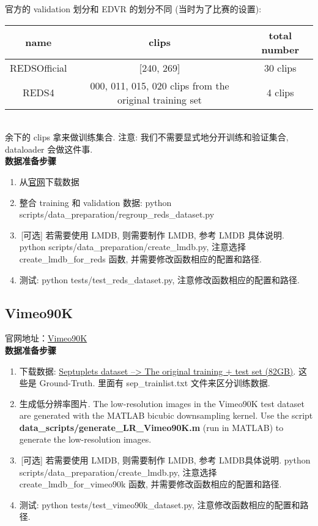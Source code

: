 \documentclass[../main.tex]{subfiles}
\begin{document}
官方的 validation 划分和 EDVR 的划分不同 (当时为了比赛的设置):\\
\begin{table}[htbp]
    \centering
    {
        \begin{tabular}{|c|c|c|}
            \hline
            \textbf{name} & \textbf{clips} & \textbf{total number}                               \\ \hline
            REDSOfficial              & [240, 269]      & 30 clips                               \\ \hline
            REDS4          & 000, 011, 015, 020 clips from the original training set      & 4 clips       \\ \hline
        \end{tabular}
    }
\end{table}\\
余下的 clips 拿来做训练集合. 注意: 我们不需要显式地分开训练和验证集合, dataloader 会做这件事.\\

\noindent\textbf{数据准备步骤}

\begin{enumerate}
\item 从\href{https://seungjunnah.github.io/Datasets/reds.html}{官网}下载数据
\item 整合 training 和 validation 数据: python scripts/data\_preparation/regroup\_reds\_dataset.py
\item\,[可选] 若需要使用 LMDB, 则需要制作 LMDB, 参考 LMDB 具体说明. python scripts/data\_preparation/create\_lmdb.py, 注意选择 create\_lmdb\_for\_reds 函数, 并需要修改函数相应的配置和路径.
\item 测试: python tests/test\_reds\_dataset.py, 注意修改函数相应的配置和路径.
\end{enumerate}

\subsection{Vimeo90K}

官网地址：\href{http://toflow.csail.mit.edu/}{Vimeo90K}\\

\noindent\textbf{数据准备步骤}
\begin{enumerate}
\item 下载数据: \href{http://data.csail.mit.edu/tofu/dataset/vimeo_septuplet.zip}{Septuplets dataset --> The original training + test set (82GB)}. 这些是 Ground-Truth. 里面有 sep\_trainlist.txt 文件来区分训练数据.
\item 生成低分辨率图片. The low-resolution images in the Vimeo90K test dataset are generated with the MATLAB bicubic downsampling kernel. Use the script \textbf{data\_scripts/generate\_LR\_Vimeo90K.m} (run in MATLAB) to generate the low-resolution images.
\item\,[可选] 若需要使用 LMDB, 则需要制作 LMDB, 参考 LMDB具体说明. python scripts/data\_preparation/create\_lmdb.py, 注意选择 create\_lmdb\_for\_vimeo90k 函数, 并需要修改函数相应的配置和路径.
\item 测试: python tests/test\_vimeo90k\_dataset.py, 注意修改函数相应的配置和路径.
\end{enumerate}
\end{document}
